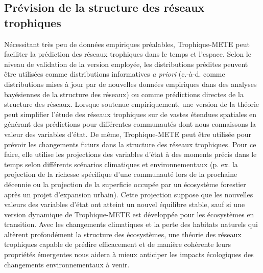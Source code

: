 \subsection{Prévision de la structure des réseaux trophiques} 

Nécessitant très peu de données empiriques préalables, Trophique-METE peut
faciliter la prédiction des réseaux trophiques dans le temps et l'espace. Selon
le niveau de validation de la version employée, les distributions prédites
peuvent être utilisées comme distributions informatives \textit{a priori}
(c.-à-d. comme distributions mises à jour par de nouvelles données empiriques
dans des analyses bayésiennes de la structure des réseaux) ou comme prédictions
directes de la structure des réseaux. Lorsque soutenue empiriquement, une
version de la théorie peut simplifier l'étude des réseaux trophiques sur de
vastes étendues spatiales en générant des prédictions pour différentes
communautés dont nous connaissons la valeur des variables d'état. De même,
Trophique-METE peut être utilisée pour prévoir les changements futurs dans la
structure des réseaux trophiques. Pour ce faire, elle utilise les projections
des variables d'état à des moments précis dans le temps selon différents
scénarios climatiques et environnementaux (p. ex. la projection de la richesse
spécifique d'une communauté lors de la prochaine décennie ou la projection de la
superficie occupée par un écosystème forestier après un projet d'expansion
urbain). Cette projection suppose que les nouvelles valeurs des variables d'état
ont atteint un nouvel équilibre stable, sauf si une version dynamique de
Trophique-METE est développée pour les écosystèmes en transition. Avec les
changements climatiques et la perte des habitats naturels qui altèrent
profondément la structure des écosystèmes, une théorie des réseaux trophiques
capable de prédire efficacement et de manière cohérente leurs propriétés
émergentes nous aidera à mieux anticiper les impacts écologiques des changements
environnementaux à venir. 

\endinput
